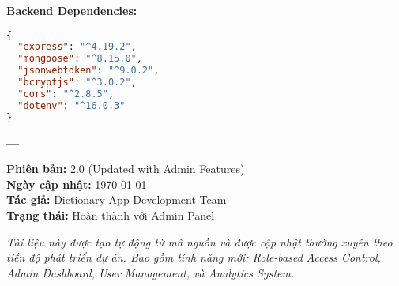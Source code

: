 \documentclass[12pt,a4paper]{article}
\begin{document}
\textbf{Backend Dependencies:}
\begin{lstlisting}[language=json]
{
  "express": "^4.19.2",
  "mongoose": "^8.15.0", 
  "jsonwebtoken": "^9.0.2",
  "bcryptjs": "^3.0.2",
  "cors": "^2.8.5",
  "dotenv": "^16.0.3"
}
\end{lstlisting}

\vspace{1cm}

\begin{center}
\textbf{---}

\textbf{Phiên bản:} 2.0 (Updated with Admin Features) \\
\textbf{Ngày cập nhật:} \today \\
\textbf{Tác giả:} Dictionary App Development Team \\
\textbf{Trạng thái:} Hoàn thành với Admin Panel

\vspace{0.5cm}

\textit{Tài liệu này được tạo tự động từ mã nguồn và được cập nhật thường xuyên theo tiến độ phát triển dự án. Bao gồm tính năng mới: Role-based Access Control, Admin Dashboard, User Management, và Analytics System.}
\end{center}
\end{document}
